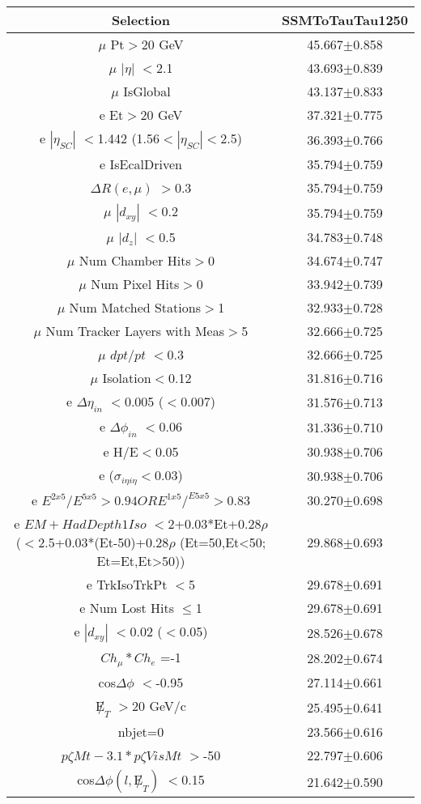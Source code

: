 {\tablepagesize
\begin{table}[htdp]
\begin{center}
\begin{tabular}{|c|c|}
\hline
 Selection  & SSMToTauTau1250\\
\hline
$\mu$ Pt$>$20 GeV & 45.667$\pm$0.858\\
\hline
$\mu$ $|\eta|$ $<$2.1 & 43.693$\pm$0.839\\
\hline
$\mu$ IsGlobal & 43.137$\pm$0.833\\
\hline
e Et$>$20 GeV & 37.321$\pm$0.775\\
\hline
e $|\eta_{SC}|$ $<$1.442 (1.56$<|\eta_{SC}|<$2.5) & 36.393$\pm$0.766\\
\hline
e IsEcalDriven & 35.794$\pm$0.759\\
\hline
$\Delta R(e,\mu)$ $>$0.3 & 35.794$\pm$0.759\\
\hline
$\mu$ $|d_{xy}|$ $<$0.2 & 35.794$\pm$0.759\\
\hline
$\mu$ $|d_{z}|$ $<$0.5 & 34.783$\pm$0.748\\
\hline
$\mu$ Num Chamber Hits$>$0 & 34.674$\pm$0.747\\
\hline
$\mu$ Num Pixel Hits$>$0 & 33.942$\pm$0.739\\
\hline
$\mu$ Num Matched Stations$>$1 & 32.933$\pm$0.728\\
\hline
$\mu$ Num Tracker Layers with Meas$>$5 & 32.666$\pm$0.725\\
\hline
$\mu$ $dpt/pt$ $<$0.3 & 32.666$\pm$0.725\\
\hline
$\mu$ Isolation$<$0.12 & 31.816$\pm$0.716\\
\hline
e $\Delta\eta_{in}$ $<$0.005 ($<$0.007) & 31.576$\pm$0.713\\
\hline
e $\Delta\phi_{in}$ $<$0.06 & 31.336$\pm$0.710\\
\hline
e H/E$<$0.05 & 30.938$\pm$0.706\\
\hline
e ($\sigma_{i\eta i\eta}<$0.03) & 30.938$\pm$0.706\\
\hline
e $E^{2x5}/E^{5x5}>0.94 OR E^{1x5}/^{E5x5} > 0.83$  & 30.270$\pm$0.698\\
\hline
e $EM+HadDepth1Iso$ $<$2+0.03*Et+0.28$\rho$ ($<$2.5+0.03*(Et-50)+0.28$\rho$ (Et=50,Et<50; Et=Et,Et>50)) & 29.868$\pm$0.693\\
\hline
e TrkIsoTrkPt $<$5 & 29.678$\pm$0.691\\
\hline
e Num Lost Hits $\leq$1 & 29.678$\pm$0.691\\
\hline
e $|d_{xy}|$ $<$0.02 ($<$0.05) & 28.526$\pm$0.678\\
\hline
$Ch_{\mu}*Ch_{e}$ =-1 & 28.202$\pm$0.674\\
\hline
cos$\Delta\phi$ $<$-0.95 & 27.114$\pm$0.661\\
\hline
${\not E_T}$ $>$20 GeV/c & 25.495$\pm$0.641\\
\hline
nbjet=0 & 23.566$\pm$0.616\\
\hline
$p\zeta Mt-3.1*p\zeta VisMt$ $>$-50 & 22.797$\pm$0.606\\
\hline
cos$\Delta\phi(l,{\not E_T})$ $<$0.15 & 21.642$\pm$0.590\\
\hline
\end{tabular}
\end{center}
\end{table}
}
